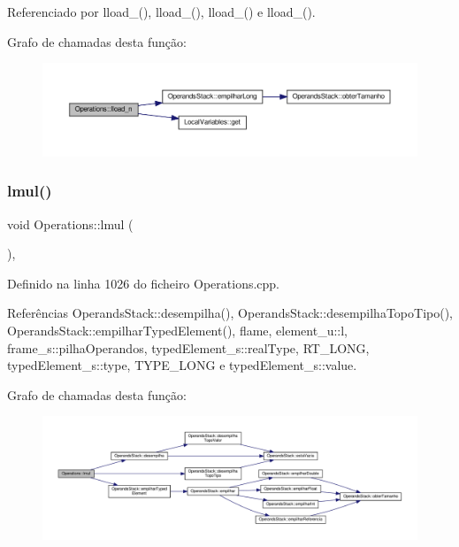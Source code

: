 Referenciado por lload\+\_(), lload\+\_(), lload\+\_() e lload\+\_().

Grafo de chamadas desta função\+:
\nopagebreak
\begin{figure}[H]
\begin{center}
\leavevmode
\includegraphics[width=350pt]{classOperations_a4f70442aed776d9ccae4dfd379715cd4_cgraph}
\end{center}
\end{figure}
\mbox{\label{classOperations_ae23a8dfdcc02432b6f880334fa4a7c59}} 
\subsubsection{\texorpdfstring{lmul()}{lmul()}}
{\footnotesize\ttfamily void Operations\+::lmul (\begin{DoxyParamCaption}{ }\end{DoxyParamCaption})\hspace{0.3cm}{\ttfamily [static]}, {\ttfamily [private]}}



Definido na linha 1026 do ficheiro Operations.\+cpp.



Referências Operands\+Stack\+::desempilha(), Operands\+Stack\+::desempilha\+Topo\+Tipo(), Operands\+Stack\+::empilhar\+Typed\+Element(), flame, element\+\_\+u\+::l, frame\+\_\+s\+::pilha\+Operandos, typed\+Element\+\_\+s\+::real\+Type, R\+T\+\_\+\+L\+O\+NG, typed\+Element\+\_\+s\+::type, T\+Y\+P\+E\+\_\+\+L\+O\+NG e typed\+Element\+\_\+s\+::value.

Grafo de chamadas desta função\+:
\nopagebreak
\begin{figure}[H]
\begin{center}
\leavevmode
\includegraphics[width=350pt]{classOperations_ae23a8dfdcc02432b6f880334fa4a7c59_cgraph}
\end{center}
\end{figure}
\mbox{\label{classOperations_a0a14cc7ee880b5d5f1c3b532e8e2117c}} 
